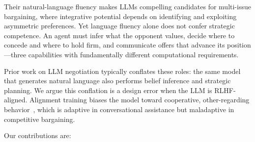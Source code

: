 \documentclass[11pt,a4paper]{article}
\begin{document}
Their natural-language fluency makes LLMs compelling candidates for multi-issue bargaining, where integrative potential depends on identifying and exploiting asymmetric preferences. Yet language fluency alone does not confer strategic competence. An agent must infer what the opponent values, decide where to concede and where to hold firm, and communicate offers that advance its position---three capabilities with fundamentally different computational requirements.

Prior work on LLM negotiation typically conflates these roles: the same model that generates natural language also performs belief inference and strategic planning. We argue this conflation is a design error when the LLM is RLHF-aligned. Alignment training biases the model toward cooperative, other-regarding behavior~\citep{perez2022discovering}, which is adaptive in conversational assistance but maladaptive in competitive bargaining.

Our contributions are:
\end{document}
